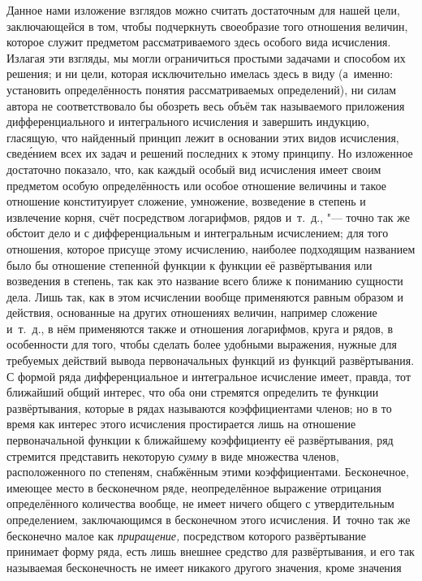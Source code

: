 Данное нами изложение взглядов можно считать достаточным для нашей цели,
заключающейся в том, чтобы подчеркнуть своеобразие того отношения величин,
которое служит предметом рассматриваемого здесь особого вида исчисления.
Излагая эти взгляды, мы могли ограничиться простыми задачами и способом их
решения; и ни цели, которая исключительно имелась здесь в виду (а~именно:
установить определённость понятия рассматриваемых определений), ни силам автора
не соответствовало бы обозреть весь объём так называемого приложения
дифференциального и интегрального исчисления и завершить индукцию, гласящую,
что найденный принцип лежит в основании этих видов исчисления, свед\'{е}нием всех
их задач и решений последних к этому принципу. Но изложенное достаточно
показало, что, как каждый особый вид исчисления имеет своим предметом особую
определённость или особое отношение величины и такое отношение конституирует
сложение, умножение, возведение в степень и извлечение корня, счёт посредством
логарифмов, рядов и~т.~д., "--- точно так же обстоит дело и с дифференциальным
и интегральным исчислением; для того отношения, которое присуще этому
исчислению, наиболее подходящим названием было бы отношение степенн\'{о}й
функции к функции её развёртывания или возведения в степень, так как это
название всего ближе к пониманию сущности дела. Лишь так, как в этом исчислении
вообще применяются равным образом и действия, основанные на других отношениях
величин, например сложение и~т.~д., в нём применяются также и отношения
логарифмов, круга и рядов, в особенности для того, чтобы сделать более удобными
выражения, нужные для требуемых действий вывода первоначальных функций из
функций развёртывания. С формой ряда дифференциальное и интегральное исчисление
имеет, правда, тот ближайший общий интерес, что оба они стремятся определить те
функции развёртывания, которые в рядах называются коэффициентами членов; но в
то время как интерес этого исчисления простирается лишь на отношение
первоначальной функции к ближайшему коэффициенту её развёртывания, ряд
стремится представить некоторую {\em сумму} в виде множества членов,
расположенного по степеням, снабжённым этими коэффициентами. Бесконечное,
имеющее место в бесконечном ряде, неопределённое выражение отрицания
определённого количества вообще, не имеет ничего общего с утвердительным
определением, заключающимся в бесконечном этого исчисления. И~точно так же
бесконечно малое как {\em приращение,} посредством которого развёртывание
принимает форму ряда, есть лишь внешнее средство для развёртывания, и его так
называемая бесконечность не имеет никакого другого значения, кроме значения
